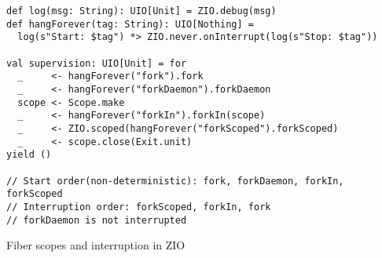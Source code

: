 \begin{algorithm}

\begin{verbatim}
def log(msg: String): UIO[Unit] = ZIO.debug(msg)
def hangForever(tag: String): UIO[Nothing] =
  log(s"Start: $tag") *> ZIO.never.onInterrupt(log(s"Stop: $tag"))

val supervision: UIO[Unit] = for
  _     <- hangForever("fork").fork
  _     <- hangForever("forkDaemon").forkDaemon
  scope <- Scope.make
  _     <- hangForever("forkIn").forkIn(scope)
  _     <- ZIO.scoped(hangForever("forkScoped").forkScoped)
  _     <- scope.close(Exit.unit)
yield ()

// Start order(non-deterministic): fork, forkDaemon, forkIn, forkScoped
// Interruption order: forkScoped, forkIn, fork
// forkDaemon is not interrupted
\end{verbatim}

\caption{Fiber scopes and interruption in ZIO \label{zio:fiber-scopes}}
\end{algorithm}